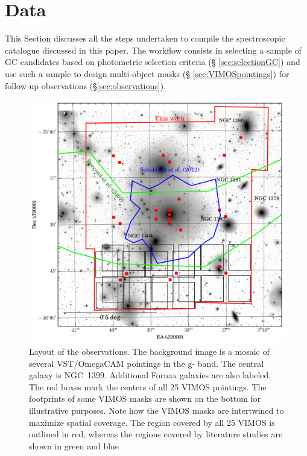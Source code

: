 \section{Data}
\label{sec:data}

This Section discusses all the steps undertaken to compile the spectroscopic 
catalogue discussed in this paper. The 
workflow consists in selecting a sample of GC candidates based on photometric 
selection criteria (\S 
\ref{sec:selectionGC}) and use such a sample to design multi-object masks (\S 
\ref{sec:VIMOSpointings}) for follow-up 
observations (\S \ref{sec:observations}).

\begin{figure}
\centering
\includegraphics[scale=0.7]{figures/fov.png} 
\caption{Layout of the observations. The background image is a mosaic of 
several VST/OmegaCAM pointings in the g-
band. The central galaxy is NGC~1399. Additional Fornax galaxies are also 
labeled. The red boxes mark the centers of all 
25 VIMOS pointings. The footprints of some VIMOS masks are shown on the bottom 
for illustrative purposes. Note how 
the VIMOS masks are intertwined to maximize spatial coverage. The region 
covered by all 25 VIMOS is outlined in red, 
whereas the regions covered by literature studies are shown in green 
\citep{Bergond07} and blue \citep{Schuberth}}
\label{fig:fov}
\end{figure}

